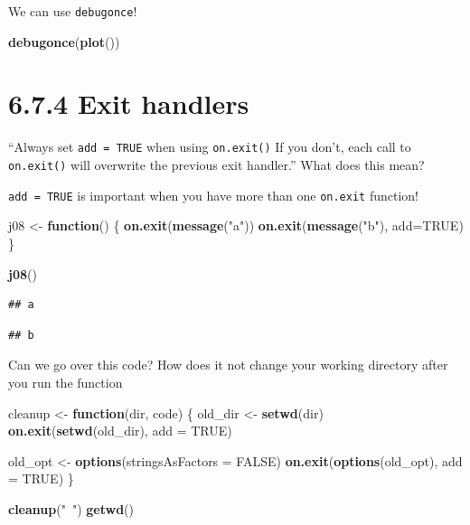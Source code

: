 \documentclass[]{book}
\newenvironment{Shaded}{\begin{snugshade}}{\end{snugshade}}
\newcommand{\ControlFlowTok}[1]{\textcolor[rgb]{0.13,0.29,0.53}{\textbf{#1}}}
\newcommand{\DataTypeTok}[1]{\textcolor[rgb]{0.13,0.29,0.53}{#1}}
\newcommand{\KeywordTok}[1]{\textcolor[rgb]{0.13,0.29,0.53}{\textbf{#1}}}
\newcommand{\NormalTok}[1]{#1}
\newcommand{\OtherTok}[1]{\textcolor[rgb]{0.56,0.35,0.01}{#1}}
\newcommand{\StringTok}[1]{\textcolor[rgb]{0.31,0.60,0.02}{#1}}
\begin{document}
We can use \texttt{debugonce}!

\begin{Shaded}
\begin{Highlighting}[]
\KeywordTok{debugonce}\NormalTok{(}\KeywordTok{plot}\NormalTok{())}
\end{Highlighting}
\end{Shaded}

\hypertarget{exit-handlers}{%
\section*{6.7.4 Exit handlers}\label{exit-handlers}}

``Always set \texttt{add\ =\ TRUE} when using \texttt{on.exit()} If you don't, each call to \texttt{on.exit()} will overwrite the previous exit handler.'' What does this mean?

\texttt{add\ =\ TRUE} is important when you have more than one \texttt{on.exit} function!

\begin{Shaded}
\begin{Highlighting}[]
\NormalTok{j08 <-}\StringTok{ }\ControlFlowTok{function}\NormalTok{() \{}
  \KeywordTok{on.exit}\NormalTok{(}\KeywordTok{message}\NormalTok{(}\StringTok{"a"}\NormalTok{))}
  \KeywordTok{on.exit}\NormalTok{(}\KeywordTok{message}\NormalTok{(}\StringTok{"b"}\NormalTok{), }\DataTypeTok{add=}\OtherTok{TRUE}\NormalTok{)}
\NormalTok{\}}

\KeywordTok{j08}\NormalTok{()}
\end{Highlighting}
\end{Shaded}

\begin{verbatim}
## a
\end{verbatim}

\begin{verbatim}
## b
\end{verbatim}

Can we go over this code? How does it not change your working directory after you run the function

\begin{Shaded}
\begin{Highlighting}[]
\NormalTok{cleanup <-}\StringTok{ }\ControlFlowTok{function}\NormalTok{(dir, code) \{}
\NormalTok{  old_dir <-}\StringTok{ }\KeywordTok{setwd}\NormalTok{(dir)}
  \KeywordTok{on.exit}\NormalTok{(}\KeywordTok{setwd}\NormalTok{(old_dir), }\DataTypeTok{add =} \OtherTok{TRUE}\NormalTok{)}
  
\NormalTok{  old_opt <-}\StringTok{ }\KeywordTok{options}\NormalTok{(}\DataTypeTok{stringsAsFactors =} \OtherTok{FALSE}\NormalTok{)}
  \KeywordTok{on.exit}\NormalTok{(}\KeywordTok{options}\NormalTok{(old_opt), }\DataTypeTok{add =} \OtherTok{TRUE}\NormalTok{)}
\NormalTok{\}}


\KeywordTok{cleanup}\NormalTok{(}\StringTok{"~"}\NormalTok{)}
\KeywordTok{getwd}\NormalTok{()}
\end{Highlighting}
\end{Shaded}
\end{document}
